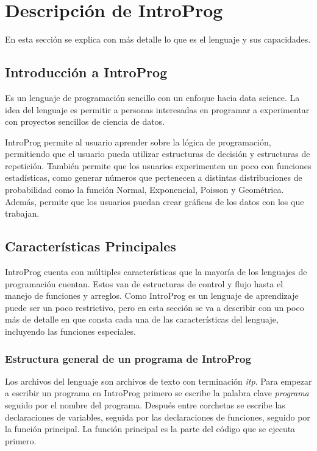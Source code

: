 \chapter{Descripción de IntroProg}

En esta sección se explica con más detalle lo que es el lenguaje y sus capacidades.
\section{Introducción a IntroProg}\label{intro}

Es un lenguaje de programación sencillo con un enfoque hacia data science. La idea del lenguaje es permitir a personas interesadas en programar a experimentar con proyectos sencillos de ciencia de datos.

IntroProg permite al usuario aprender sobre la lógica de programación, permitiendo que el usuario pueda utilizar estructuras de decisión y estructuras de repetición. También permite que los usuarios experimenten un poco con funciones estadísticas, como generar números que pertenecen a distintas distribuciones de probabilidad como la función Normal, Exponencial, Poisson y Geométrica. Además, permite que los usuarios puedan crear gráficas de los datos con los que trabajan.


\section{Características Principales}
IntroProg cuenta con múltiples características que la mayoría de los lenguajes de programación cuentan. Estos van de estructuras de control y flujo hasta el manejo de funciones y arreglos.
Como IntroProg es un lenguaje de aprendizaje puede ser un poco restrictivo, pero en esta sección se va a describir con un poco más de detalle en que consta cada una de las características del lenguaje, incluyendo las funciones especiales.

\FloatBarrier

\subsection{Estructura general de un programa de IntroProg}
Los archivos del lenguaje son archivos de texto con terminación \emph{itp}. Para empezar a escribir un programa en IntroProg primero se escribe la palabra clave \emph{programa} seguido por el nombre del programa. Después entre corchetas se escribe las declaraciones de variables, seguida por las declaraciones de funciones, seguido por la función principal. La función principal es la parte del código que se ejecuta primero.

